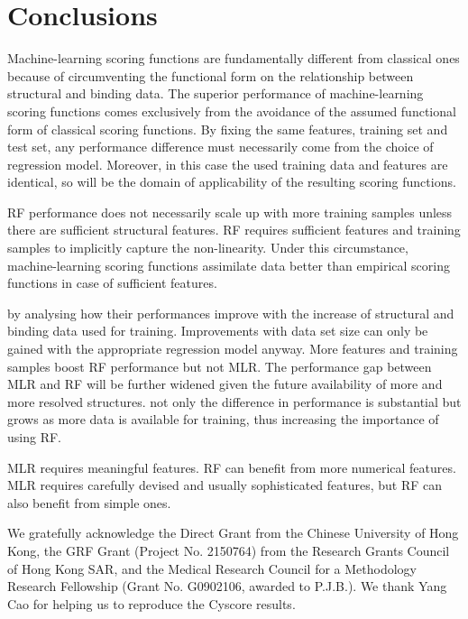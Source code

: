 \documentclass[journal=jacsat,manuscript=article]{achemso}
\begin{document}
\section{Conclusions}

Machine-learning scoring functions are fundamentally different from classical ones because of circumventing the functional form on the relationship between structural and binding data. The superior performance of machine-learning scoring functions comes exclusively from the avoidance of the assumed functional form of classical scoring functions. By fixing the same features, training set and test set, any performance difference must necessarily come from the choice of regression model. Moreover, in this case the used training data and features are identical, so will be the domain of applicability of the resulting scoring functions. 

RF performance does not necessarily scale up with more training samples unless there are sufficient structural features. RF requires sufficient features and training samples to implicitly capture the non-linearity. Under this circumstance, machine-learning scoring functions assimilate data better than empirical scoring functions in case of sufficient features.

by analysing how their performances improve with the increase of structural and binding data used for training. Improvements with data set size can only be gained with the appropriate regression model anyway. More features and training samples boost RF performance but not MLR. The performance gap between MLR and RF will be further widened given the future availability of more and more resolved structures. not only the difference in performance is substantial but grows as more data is available for training, thus increasing the importance of using RF.

MLR requires meaningful features. RF can benefit from more numerical features. MLR requires carefully devised and usually sophisticated features, but RF can also benefit from simple ones.

\begin{acknowledgement}

We gratefully acknowledge the Direct Grant from the Chinese University of Hong Kong, the GRF Grant (Project No. 2150764) from the Research Grants Council of Hong Kong SAR, and the Medical Research Council for a Methodology Research Fellowship (Grant No. G0902106, awarded to P.J.B.). We thank Yang Cao for helping us to reproduce the Cyscore results.

\end{acknowledgement}
\end{document}
